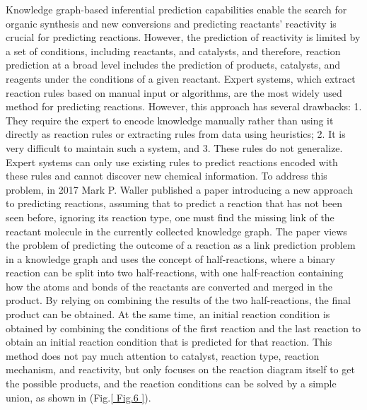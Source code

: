 \documentclass[%
 aip,
 jmp,%
 amsmath,amssymb,
 reprint,%
]{revtex4-2}
\begin{document}
Knowledge graph-based inferential prediction capabilities enable the search for organic synthesis\cite{chanda2009organic} and new conversions and predicting reactants' reactivity is crucial for predicting reactions\cite{coley2019graph}. However, the prediction of reactivity is limited by a set of conditions, including reactants, and catalysts, and therefore, reaction prediction at a broad level includes the prediction of products, catalysts, and reagents under the conditions of a given reactant. Expert systems, which extract reaction rules based on manual input or algorithms, are the most widely used method for predicting reactions\cite{chen2009no, gasteiger1987new, marcou2015expert, patel2020savi}. However, this approach has several drawbacks: 1. They require the expert to encode knowledge manually rather than using it directly as reaction rules or extracting rules from data using heuristics; 2. It is very difficult to maintain such a system, and 3. These rules do not generalize. Expert systems can only use existing rules to predict reactions encoded with these rules and cannot discover new chemical information. To address this problem, in 2017 Mark P. Waller published a paper introducing a new approach to predicting reactions, assuming that to predict a reaction that has not been seen before, ignoring its reaction type, one must find the missing link of the reactant molecule in the currently collected knowledge graph\cite{segler2017modelling}. The paper views the problem of predicting the outcome of a reaction as a link prediction problem \cite{martinez2016survey, liben2003link} in a knowledge graph and uses the concept of half-reactions, where a binary reaction can be split into two half-reactions, with one half-reaction containing how the atoms and bonds of the reactants are converted and merged in the product. By relying on combining the results of the two half-reactions, the final product can be obtained. At the same time, an initial reaction condition is obtained by combining the conditions of the first reaction and the last reaction to obtain an initial reaction condition that is predicted for that reaction. This method does not pay much attention to catalyst, reaction type, reaction mechanism, and reactivity, but only focuses on the reaction diagram itself to get the possible products, and the reaction conditions can be solved by a simple union, as shown in (Fig.\ref{ Fig.6 }).
\end{document}
